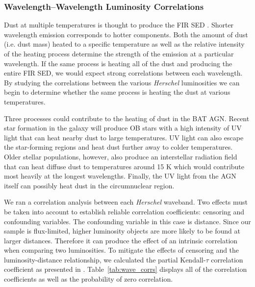\subsubsection{Wavelength--Wavelength Luminosity Correlations}
Dust at multiple temperatures is thought to produce the FIR SED \citep{Draine:2003gd}. Shorter wavelength emission corresponds to hotter components. Both the amount of dust (i.e. dust mass) heated to a specific temperature as well as the relative intensity of the heating process determine the strength of the emission at a particular wavelength. If the same process is heating all of the dust and producing the entire FIR SED, we would expect strong correlations between each wavelength. By studying the correlations between the various \textit{Herschel} luminosities we can begin to determine whether the same process is heating the dust at various temperatures.

Three processes could contribute to the heating of dust in the BAT AGN. Recent star formation in the galaxy will produce OB stars with a high intensity of UV light that can heat nearby dust to large temperatures. UV light can also escape the star-forming regions and heat dust further away to colder temperatures. Older stellar populations, however, also produce an interstellar radiation field that can heat diffuse dust to temperatures around 15 K which would contribute most heavily at the longest wavelengths. Finally, the UV light from the AGN itself can possibly heat dust in the circumnuclear region.

We ran a correlation analysis between each \textit{Herschel} waveband. Two effects must be taken into account to establish reliable correlation coefficients: censoring and confounding variables. The confounding variable in this case is distance. Since our sample is flux-limited, higher luminosity objects are more likely to be found at larger distances. Therefore it can produce the effect of an intrinsic correlation when comparing two luminosities. To mitigate the effects of censoring and the luminosity-distance relationship, we calculated the partial Kendall-$\tau$ correlation coefficient as presented in \citet{Akritas_1996}. Table~\ref{tab:wave_corrs} displays all of the correlation coefficients as well as the probability of zero correlation. 